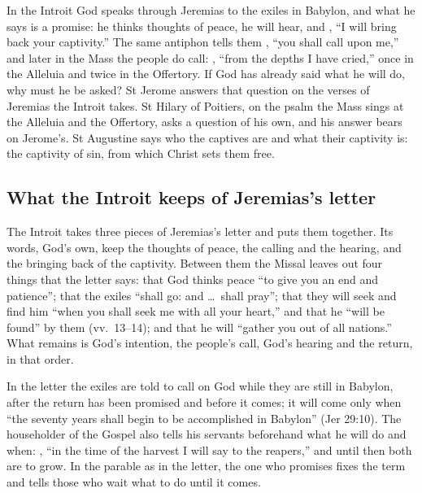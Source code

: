 
In the Introit God speaks through Jeremias to the exiles in Babylon, and what
he says is a promise: he thinks thoughts of peace, he will hear, and
, ``I will bring back your captivity.'' The same
antiphon tells them , ``you shall call upon me,'' and
later in the Mass the people do call: , ``from the
depths I have cried,'' once in the Alleluia and twice in the Offertory. If God
has already said what he will do, why must he be asked? St Jerome answers that
question on the verses of Jeremias the Introit takes. St Hilary of Poitiers,
on the psalm the Mass sings at the Alleluia and the Offertory, asks a
question of his own, and his answer bears on Jerome's. St Augustine says who
the captives are and what their captivity is: the captivity of sin, from
which Christ sets them free.

\subsection{What the Introit keeps of Jeremias's letter}
\label{sec:captivity-introit}

The Introit takes three pieces of Jeremias's letter and puts them together. Its
words, God's own, keep the thoughts of peace, the calling and the hearing,
and the bringing back of the captivity. Between them the Missal leaves out
four things that the letter says: that God thinks peace ``to give you an end
and patience''; that the exiles ``shall go: and \dots\ shall pray''; that
they will seek and find him ``when you shall seek me with all your heart,''
and that he ``will be found'' by them (vv.~13--14); and that he will ``gather
you out of all nations.'' What remains is God's intention, the people's call,
God's hearing and the return, in that order.

In the letter the exiles are told to call on God while they are still in
Babylon, after the return has been promised and before it comes; it will come
only when ``the seventy years shall begin to be accomplished in Babylon''
(Jer 29:10). The householder of the Gospel also tells his servants beforehand
what he will do and when: , ``in the
time of the harvest I will say to the reapers,'' and until then both are to
grow. In the parable as in the letter, the one who promises fixes the term
and tells those who wait what to do until it comes.

